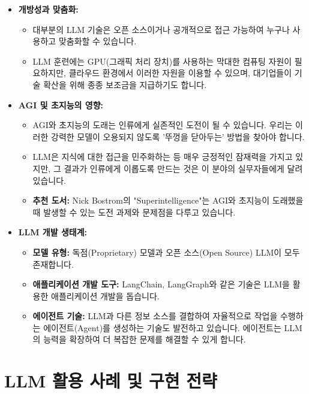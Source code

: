 \documentclass[11pt,a4paper]{article}
\theoremstyle{definition}
\begin{document}
\begin{itemize}
    \item \textbf{개방성과 맞춤화:}
    \begin{itemize}
        \item 대부분의 LLM 기술은 오픈 소스이거나 공개적으로 접근 가능하여 누구나 사용하고 맞춤화할 수 있습니다.
        \item LLM 훈련에는 GPU(그래픽 처리 장치)를 사용하는 막대한 컴퓨팅 자원이 필요하지만, 클라우드 환경에서 이러한 자원을 이용할 수 있으며, 대기업들이 기술 확산을 위해 종종 보조금을 지급하기도 합니다.
    \end{itemize}

    \item \textbf{AGI 및 초지능의 영향:}
    \begin{itemize}
        \item AGI와 초지능의 도래는 인류에게 실존적인 도전이 될 수 있습니다. 우리는 이러한 강력한 모델이 오용되지 않도록 '뚜껑을 닫아두는' 방법을 찾아야 합니다.
        \item LLM은 지식에 대한 접근을 민주화하는 등 매우 긍정적인 잠재력을 가지고 있지만, 그 결과가 인류에게 이롭도록 만드는 것은 이 분야의 실무자들에게 달려 있습니다.
        \item \textbf{추천 도서:} Nick Bostrom의 "Superintelligence"는 AGI와 초지능이 도래했을 때 발생할 수 있는 도전 과제와 문제점을 다루고 있습니다.
    \end{itemize}

    \item \textbf{LLM 개발 생태계:}
    \begin{itemize}
        \item \textbf{모델 유형:} 독점(Proprietary) 모델과 오픈 소스(Open Source) LLM이 모두 존재합니다.
        \item \textbf{애플리케이션 개발 도구:} LangChain, LangGraph와 같은 기술은 LLM을 활용한 애플리케이션 개발을 돕습니다.
        \item \textbf{에이전트 기술:} LLM과 다른 정보 소스를 결합하여 자율적으로 작업을 수행하는 에이전트(Agent)를 생성하는 기술도 발전하고 있습니다. 에이전트는 LLM의 능력을 확장하여 더 복잡한 문제를 해결할 수 있게 합니다.
    \end{itemize}
\end{itemize}

\newpage
\section{LLM 활용 사례 및 구현 전략}
\end{document}
